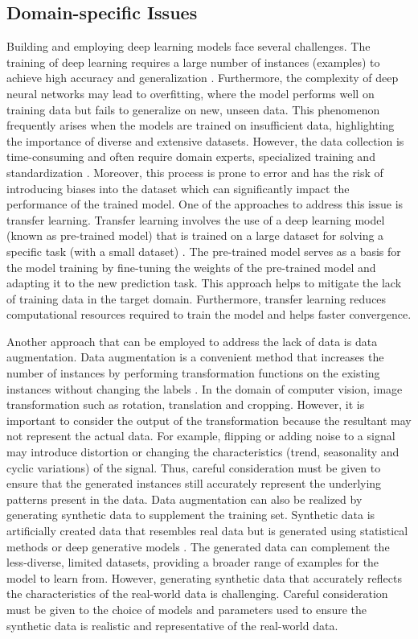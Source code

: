 \documentclass[preprint,12pt]{elsarticle}
\begin{document}
\subsection{Domain-specific Issues}
Building and employing deep learning models face several challenges. The training of deep learning requires a large number of instances (examples) to achieve high accuracy and generalization \citep{munappy_data_2022}. Furthermore, the complexity of deep neural networks may lead to overfitting, where the model performs well on training data but fails to generalize on new, unseen data. This phenomenon frequently arises when the models are trained on insufficient data, highlighting the importance of diverse and extensive datasets. However, the data collection is time-consuming and often require domain experts, specialized training and standardization \citep{luca_impact_2022}. Moreover, this process is prone to error and has the risk of introducing biases into the dataset which can significantly impact the performance of the trained model. One of the approaches to address this issue is transfer learning. Transfer learning involves the use of a deep learning model (known as pre-trained model) that is trained on a large dataset for solving a specific task (with a small dataset) \citep{zhuang_comprehensive_2020}. The pre-trained model serves as a basis for the model training by fine-tuning the weights of the pre-trained model and adapting it to the new prediction task. This approach helps to mitigate the lack of training data in the target domain. Furthermore, transfer learning reduces computational resources required to train the model and helps faster convergence. 

Another approach that can be employed to address the lack of data is data augmentation. Data augmentation is a convenient method that increases the number of instances by performing transformation functions on the existing instances without changing the labels \citep{mumuni_data_2022}. In the domain of computer vision, image transformation such as rotation, translation and cropping. However, it is important to consider the output of the transformation because the resultant may not represent the actual data. For example, flipping or adding noise to a signal may introduce distortion or changing the characteristics (trend, seasonality and cyclic variations) of the signal. Thus, careful consideration must be given to ensure that the generated instances still accurately represent the underlying patterns present in the data. Data augmentation can also be realized by generating synthetic data to supplement the training set. Synthetic data is artificially created data that resembles real data but is generated using statistical methods or deep generative models \citep{hu_survey_2023,murtaza_synthetic_2023}. The generated data can complement the less-diverse, limited datasets, providing a broader range of examples for the model to learn from. However, generating synthetic data that accurately reflects the characteristics of the real-world data is challenging. Careful consideration must be given to the choice of models and parameters used to ensure the synthetic data is realistic and representative of the real-world data.
\end{document}
